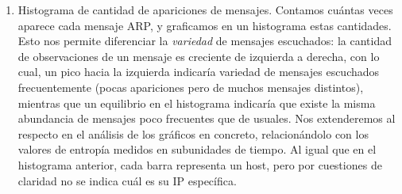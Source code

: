 \begin{enumerate}
 \item Histograma de cantidad de apariciones de mensajes. Contamos cuántas veces aparece cada mensaje ARP, y graficamos en un histograma estas cantidades. Esto nos permite diferenciar la \emph{variedad} de mensajes escuchados: la cantidad de observaciones de un mensaje es creciente de izquierda a derecha, con lo cual, un pico hacia la izquierda indicaría variedad de mensajes escuchados frecuentemente (pocas apariciones pero de muchos mensajes distintos), mientras que un equilibrio en el histograma indicaría que existe la misma abundancia de mensajes poco frecuentes que de usuales. Nos extenderemos al respecto en el análisis de los gráficos en concreto, relacionándolo con los valores de entropía medidos en subunidades de tiempo. Al igual que en el histograma anterior, cada barra representa un host, pero por cuestiones de claridad no se indica cu\'al es su IP espec\'ifica.
 
\end{enumerate}


